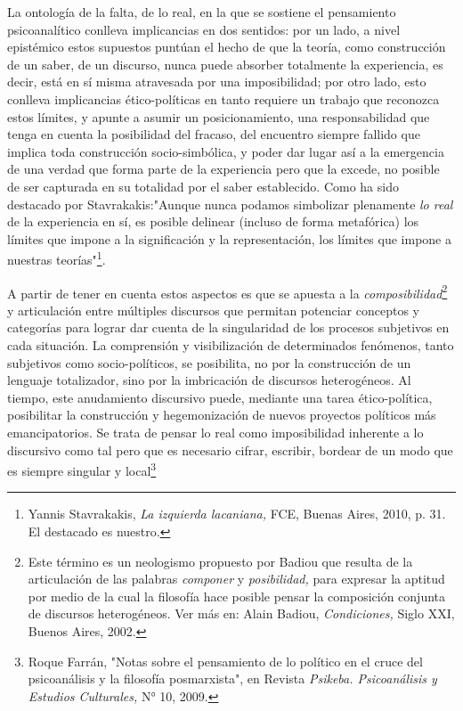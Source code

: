 \documentclass{book}
\begin{document}
La ontología de la falta, de lo real, en la que se sostiene el
pensamiento psicoanalítico conlleva implicancias en dos sentidos: por un
lado, a nivel epistémico estos supuestos puntúan el hecho de que la
teoría, como construcción de un saber, de un discurso, nunca puede
absorber totalmente la experiencia, es decir, está en sí misma
atravesada por una imposibilidad; por otro lado, esto conlleva
implicancias ético-políticas en tanto requiere un trabajo que reconozca
estos límites, y apunte a asumir un posicionamiento, una responsabilidad
que tenga en cuenta la posibilidad del fracaso, del encuentro siempre
fallido que implica toda construcción socio-simbólica, y poder dar lugar
así a la emergencia de una verdad que forma parte de la experiencia pero
que la excede, no posible de ser capturada en su totalidad por el saber
establecido. Como ha sido destacado por Stavrakakis:"Aunque nunca
podamos simbolizar plenamente \emph{lo real} de la experiencia en sí, es
posible delinear (incluso de forma metafórica) los límites que impone a
la significación y la representación, los límites que impone a nuestras
teorías"\footnote{Yannis Stavrakakis, \emph{La izquierda lacaniana,}
  FCE, Buenas Aires, 2010, p. 31. El destacado es nuestro.}.

A partir de tener en cuenta estos aspectos es que se apuesta a la
\emph{composibilidad}\footnote{Este término es un neologismo propuesto
  por Badiou que resulta de la articulación de las palabras
  \emph{componer} y \emph{posibilidad,} para expresar la aptitud por
  medio de la cual la filosofía hace posible pensar la composición
  conjunta de discursos heterogéneos. Ver más en: Alain Badiou,
  \emph{Condiciones,} Siglo XXI, Buenos Aires, 2002.} y articulación
entre múltiples discursos que permitan potenciar conceptos y categorías
para lograr dar cuenta de la singularidad de los procesos subjetivos en
cada situación. La comprensión y visibilización de determinados
fenómenos, tanto subjetivos como socio-políticos, se posibilita, no por
la construcción de un lenguaje totalizador, sino por la imbricación de
discursos heterogéneos. Al tiempo, este anudamiento discursivo puede,
mediante una tarea ético-política, posibilitar la construcción y
hegemonización de nuevos proyectos políticos más emancipatorios. Se
trata de pensar lo real como imposibilidad inherente a lo discursivo
como tal pero que es necesario cifrar, escribir, bordear de un modo que
es siempre singular y local\footnote{Roque Farrán, "Notas sobre el
  pensamiento de lo político en el cruce del psicoanálisis y la
  filosofía posmarxista", en Revista \emph{Psikeba. Psicoanálisis y
  Estudios Culturales,} N° 10, 2009.}
\end{document}
